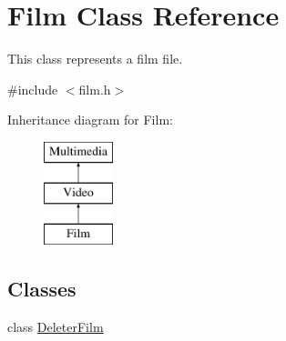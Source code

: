 \hypertarget{class_film}{\section{Film Class Reference}
\label{class_film}
}


This class represents a film file.  




{\ttfamily \#include $<$film.\-h$>$}

Inheritance diagram for Film\-:\begin{figure}[H]
\begin{center}
\leavevmode
\includegraphics[height=3.000000cm]{class_film}
\end{center}
\end{figure}
\subsection*{Classes}
\begin{DoxyCompactItemize}
\item 
class \hyperlink{class_film_1_1_deleter_film}{Deleter\-Film}
\end{DoxyCompactItemize}
